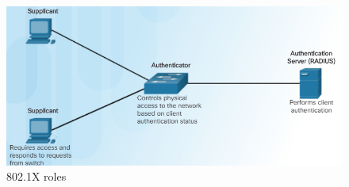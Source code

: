 \begin{figure}[hbtp]
\caption{802.1X roles}\label{802.1X}
\centering
\includegraphics[scale=0.7]{pictures/8021X.PNG}
\end{figure}






